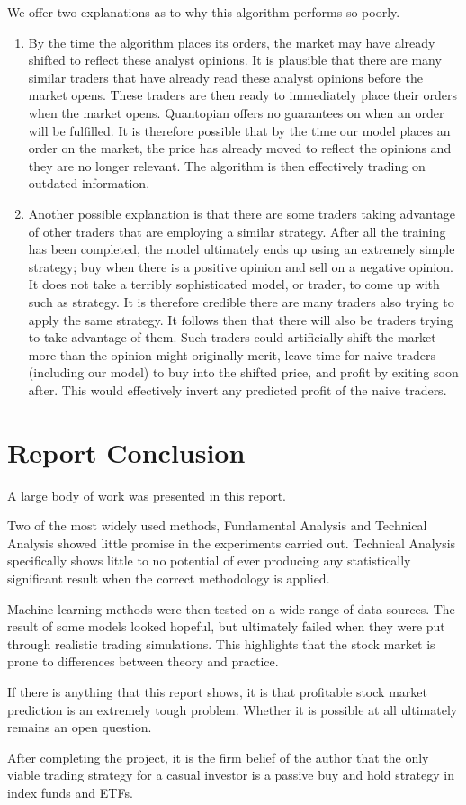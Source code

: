 \documentclass{report}
\begin{document}
We offer two explanations as to why this algorithm performs so poorly. 
\begin{enumerate}
  \item By the time the algorithm places its orders, the market may have already shifted to reflect these analyst opinions. It is plausible that there are many similar traders that have already read these analyst opinions before the market opens. These traders are then ready to immediately place their orders when the market opens. Quantopian offers no guarantees on when an order will be fulfilled. It is therefore possible that by the time our model places an order on the market, the price has already moved to reflect the opinions and they are no longer relevant. The algorithm is then effectively trading on outdated information.
  
  \item Another possible explanation is that there are some traders taking advantage of other traders that are employing a similar strategy. After all the training has been completed, the model ultimately ends up using an extremely simple strategy; buy when there is a positive opinion and sell on a negative opinion. It does not take a terribly sophisticated model, or trader, to come up with such as strategy. It is therefore credible there are many traders also trying to apply the same strategy. It follows then that there will also be traders trying to take advantage of them. Such traders could artificially shift the market more than the opinion might originally merit, leave time for naive traders (including our model) to buy into the shifted price, and profit by exiting soon after. This would effectively invert any predicted profit of the naive traders.
\end{enumerate}

\chapter{Report Conclusion}

A large body of work was presented in this report. 

Two of the most widely used methods, Fundamental Analysis and Technical Analysis showed little promise in the experiments carried out. Technical Analysis specifically shows little to no potential of ever producing any statistically significant result when the correct methodology is applied.

Machine learning methods were then tested on a wide range of data sources. The result of some models looked hopeful, but ultimately failed when they were put through realistic trading simulations. This highlights that the stock market is prone to differences between theory and practice.

If there is anything that this report shows, it is that profitable stock market prediction is an extremely tough problem. Whether it is possible at all ultimately remains an open question. 

After completing the project, it is the firm belief of the author that the only viable trading strategy for a casual investor is a passive buy and hold strategy in index funds and ETFs.



\end{document}
